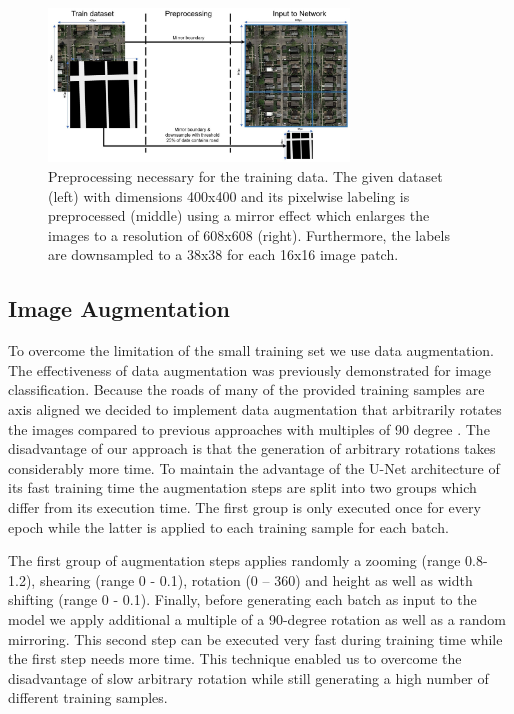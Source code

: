 \documentclass[10pt,conference,compsocconf]{IEEEtran}
\begin{document}
\begin{figure}
\includegraphics[width={8cm}]{preprocessing}
\caption{Preprocessing necessary for the training data. The given dataset (left) with dimensions 400x400 and its pixelwise labeling is preprocessed (middle) using a mirror effect which enlarges the images to a resolution of 608x608 (right). Furthermore, the labels are downsampled to a 38x38 for each 16x16 image patch.}
\label{fig:preprocessing}
\end{figure}

\subsection{Image Augmentation}

To overcome the limitation of the small training set we use data augmentation. The effectiveness of data augmentation was previously demonstrated \cite{Wang} for image classification. Because the roads of many of the provided training samples are axis aligned we decided to implement data augmentation that arbitrarily rotates the images compared to previous approaches with multiples of 90 degree \cite{Pavllo2017}. The disadvantage of our approach is that the generation of arbitrary rotations takes considerably more time. To maintain the advantage of the U-Net architecture of its fast training time \cite{Ronneberger2015} the augmentation steps are split into two groups which differ from its execution time. The first group is only executed once for every epoch while the latter is applied to each training sample for each batch.

The first group of augmentation steps applies randomly a zooming (range 0.8-1.2), shearing (range 0 - 0.1), rotation (0 – 360) and height as well as width shifting (range 0 - 0.1). Finally, before generating each batch as input to the model we apply additional a multiple of a 90-degree rotation as well as a random mirroring. This second step can be executed very fast during training time while the first step needs more time. This technique enabled us to overcome the disadvantage of slow arbitrary rotation while still generating a high number of different training samples.
\end{document}
